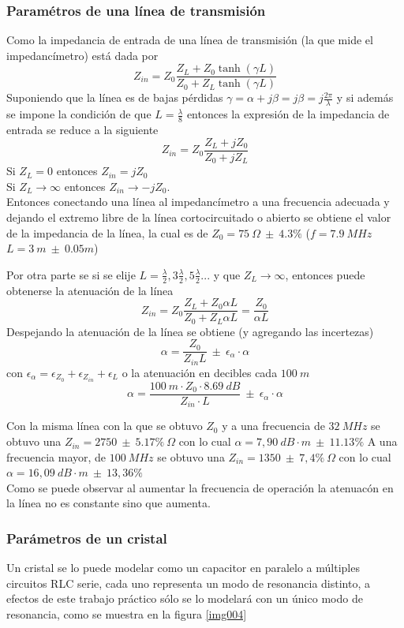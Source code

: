 \documentclass[a4paper,10pt]{article}
\begin{document}
		\subsubsection{Param\'etros de una l\'inea de transmisi\'on}
		Como la impedancia de entrada de una l\'inea de transmisi\'on (la que mide el impedanc\'imetro) est\'a dada por $$Z_{in}=Z_0\frac{Z_L+Z_0\tanh(\gamma L)}{Z_0+Z_L\tanh(\gamma L)}$$
		Suponiendo que la l\'inea es de bajas p\'erdidas $\gamma=\alpha+j\beta=j\beta=j\frac{2\pi}{\lambda}$ y si adem\'as se impone la condici\'on de que $L=\frac{\lambda}{8}$ entonces la expresi\'on de la impedancia de entrada se reduce a la siguiente
		$$Z_{in}=Z_0\frac{Z_L+jZ_0}{Z_0+jZ_L}$$
		Si $Z_L= 0$ entonces $Z_{in}=jZ_0$ \\
		Si $Z_L \rightarrow \infty$ entonces $Z_{in}\rightarrow-jZ_0$.\\
		Entonces conectando una l\'inea al impedanc\'imetro a una frecuencia adecuada y dejando el extremo libre de la l\'inea cortocircuitado o abierto se obtiene el valor de la impedancia de la l\'inea, la cual es de $Z_0=75~\Omega~\pm~4.3\%$ ($f=7.9~MHz$ $L=3~m~\pm~0.05m$)
		
		Por otra parte se si se elije $L=\frac{\lambda}{2},3\frac{\lambda}{2}, 5\frac{\lambda}{2} ...$ y que $Z_L\rightarrow\infty$, entonces puede obtenerse la atenuaci\'on de la l\'inea
		$$Z_{in}=Z_0\frac{Z_L+Z_0\alpha L}{Z_0+Z_L\alpha L}=\frac{Z_0}{\alpha L}$$
		Despejando la atenuaci\'on de la l\'inea se obtiene (y agregando las incertezas)
		$$\alpha=\frac{Z_0}{Z_{in} L}~\pm~\epsilon_{\alpha}\cdot\alpha$$
		con $\epsilon_{\alpha}=\epsilon_{Z_0}+\epsilon_{Z_{in}}+\epsilon_{L}$
		o la atenuaci\'on en decibles cada $100~m$
		$$\alpha=\frac{100~m\cdot Z_0\cdot8.69~dB}{Z_{in}\cdot L}~\pm~\epsilon_{\alpha}\cdot \alpha$$
		
		Con la misma l\'inea con la que se obtuvo $Z_0$ y a una frecuencia de $32~MHz$ se obtuvo una $Z_{in}=2750~\pm~5.17\%~\Omega$ con lo cual $\alpha=7,90~dB\cdot m~\pm~11.13\%$
		A una frecuencia mayor, de $100~MHz$ se obtuvo una $Z_{in}=1350~\pm~7,4\%~\Omega$ con lo cual $\alpha=16,09~dB\cdot m~\pm~13,36\%$\\
		\indent Como se puede observar al aumentar la frecuencia de operaci\'on la atenuac\'on en la l\'inea no es constante sino que aumenta.
		\subsubsection{Par\'ametros de un cristal}	
		\indent Un cristal se lo puede modelar como un capacitor en paralelo a 
		múltiples circuitos RLC serie, cada uno representa un modo de resonancia
		distinto, a efectos de este trabajo práctico sólo se lo modelará con un 
		único modo de resonancia, como se muestra en la figura \ref{img004}
\end{document}
